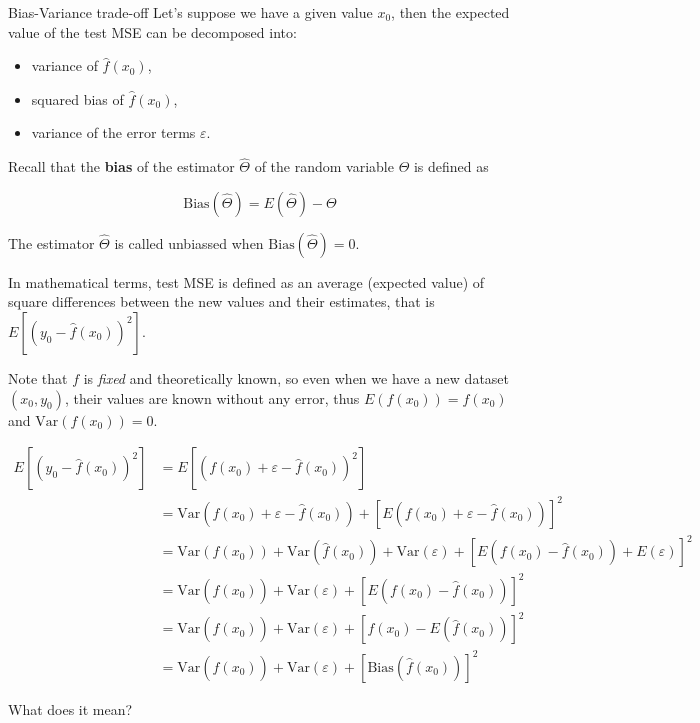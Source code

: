 \documentclass[
  ignorenonframetext,
]{beamer}
\providecommand{\tightlist}{%
  \setlength{\itemsep}{0pt}\setlength{\parskip}{0pt}}\usepackage{longtable,booktabs,array}
\begin{document}
\begin{frame}[fragile]{Bias-Variance trade-off}
\label{bias-variance-trade-off}
Let's suppose we have a given value \(x_0\), then the expected value of
the test MSE can be decomposed into:

\begin{itemize}
\tightlist
\item
  variance of \(\hat{f}(x_0)\),
\item
  squared bias of \(\hat{f}(x_0)\),
\item
  variance of the error terms \(\varepsilon\).
\end{itemize}

Recall that the \textbf{bias} of the estimator \(\hat{\Theta}\) of the
random variable \(\Theta\) is defined as

\[
\mathrm{Bias}(\hat{\Theta})= E(\hat{\Theta}) - \Theta 
\]

The estimator \(\hat{\Theta}\) is called unbiassed when
\(\mathrm{Bias}(\hat{\Theta})=0\).

In mathematical terms, test MSE is defined as an average (expected
value) of square differences between the new values and their estimates,
that is \(E[(y_0-\hat{f}(x_0))^2]\).

Note that \(f\) is \emph{fixed} and theoretically known, so even when we
have a new dataset \((x_0,y_0)\), their values are known without any
error, thus \(E(f(x_0))=f(x_0)\) and \(\mathrm{Var}(f(x_0))=0\).

\[
\begin{split}
E\left[ (y_0- \hat{f}(x_0))^2 \right] &= E[ (f(x_0)+ \varepsilon - \hat{f}(x_0))^2 ]\\
&= \mathrm{Var}(f(x_0) + \varepsilon - \hat{f}(x_0)) + \left[ E(f(x_0)+\varepsilon -\hat{f}(x_0))\right]^2 \\
&= \mathrm{Var}(f(x_0))+ \mathrm{Var}(\hat{f}(x_0)) + \mathrm{Var}(\varepsilon) + 
\left[ E(f(x_0)-\hat{f}(x_0))+ E(\varepsilon)\right]^2\\
&= \mathrm{Var}(\hat{f}(x_0)) +\mathrm{Var}(\varepsilon) + \left[ E(f(x_0)-\hat{f}(x_0))\right]^2\\
&= \mathrm{Var}(\hat{f}(x_0)) +\mathrm{Var}(\varepsilon) + \left[ f(x_0) - E(\hat{f}(x_0))\right]^2\\
&= \mathrm{Var}(\hat{f}(x_0)) +\mathrm{Var}(\varepsilon) + \left[\mathrm{Bias}(\hat{f}(x_0)) \right]^2
\end{split}
\]

What does it mean?


\end{frame}
\end{document}

